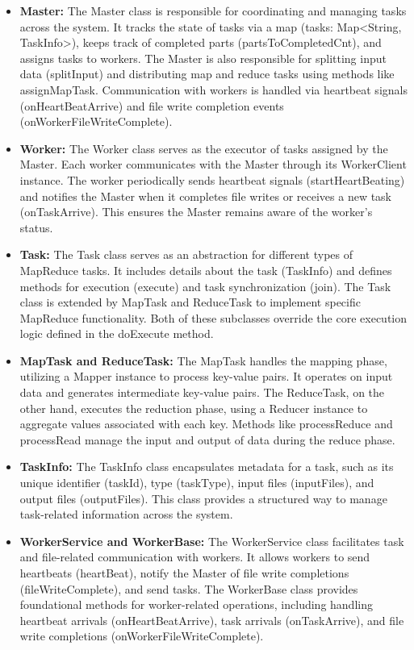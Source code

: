 \begin{itemize}
    \item \textbf{Master:} The Master class is responsible for coordinating and managing tasks across the system. It tracks the state of tasks via a map (tasks: Map<String, TaskInfo>), keeps track of completed parts (partsToCompletedCnt), and assigns tasks to workers. The Master is also responsible for splitting input data (splitInput) and distributing map and reduce tasks using methods like assignMapTask. Communication with workers is handled via heartbeat signals (onHeartBeatArrive) and file write completion events (onWorkerFileWriteComplete).
    \item \textbf{Worker:} The Worker class serves as the executor of tasks assigned by the Master. Each worker communicates with the Master through its WorkerClient instance. The worker periodically sends heartbeat signals (startHeartBeating) and notifies the Master when it completes file writes or receives a new task (onTaskArrive). This ensures the Master remains aware of the worker’s status.
    \item \textbf{Task:} The Task class serves as an abstraction for different types of MapReduce tasks. It includes details about the task (TaskInfo) and defines methods for execution (execute) and task synchronization (join). The Task class is extended by MapTask and ReduceTask to implement specific MapReduce functionality. Both of these subclasses override the core execution logic defined in the doExecute method.
    \item \textbf{MapTask and ReduceTask:} The MapTask handles the mapping phase, utilizing a Mapper instance to process key-value pairs. It operates on input data and generates intermediate key-value pairs. The ReduceTask, on the other hand, executes the reduction phase, using a Reducer instance to aggregate values associated with each key. Methods like processReduce and processRead manage the input and output of data during the reduce phase.
    \item \textbf{TaskInfo:} The TaskInfo class encapsulates metadata for a task, such as its unique identifier (taskId), type (taskType), input files (inputFiles), and output files (outputFiles). This class provides a structured way to manage task-related information across the system.
    \item \textbf{WorkerService and WorkerBase:} The WorkerService class facilitates task and file-related communication with workers. It allows workers to send heartbeats (heartBeat), notify the Master of file write completions (fileWriteComplete), and send tasks. The WorkerBase class provides foundational methods for worker-related operations, including handling heartbeat arrivals (onHeartBeatArrive), task arrivals (onTaskArrive), and file write completions (onWorkerFileWriteComplete).

\end{itemize}
